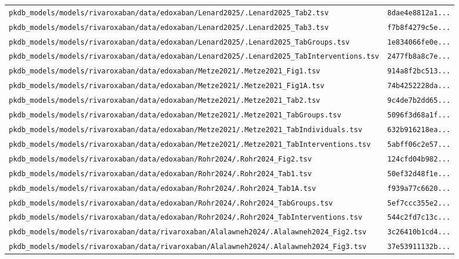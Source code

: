 \begin{longtable}{ll}
\texttt{pkdb\_models/models/rivaroxaban/data/edoxaban/Lenard2025/.Lenard2025\_Tab2.tsv} & \texttt{8dae4e8812a1...} \\
\texttt{pkdb\_models/models/rivaroxaban/data/edoxaban/Lenard2025/.Lenard2025\_Tab3.tsv} & \texttt{f7b8f4279c5e...} \\
\texttt{pkdb\_models/models/rivaroxaban/data/edoxaban/Lenard2025/.Lenard2025\_TabGroups.tsv} & \texttt{1e834066fe0e...} \\
\texttt{pkdb\_models/models/rivaroxaban/data/edoxaban/Lenard2025/.Lenard2025\_TabInterventions.tsv} & \texttt{2477fb8a8c7e...} \\
\texttt{pkdb\_models/models/rivaroxaban/data/edoxaban/Metze2021/.Metze2021\_Fig1.tsv} & \texttt{914a8f2bc513...} \\
\texttt{pkdb\_models/models/rivaroxaban/data/edoxaban/Metze2021/.Metze2021\_Fig1A.tsv} & \texttt{74b4252228da...} \\
\texttt{pkdb\_models/models/rivaroxaban/data/edoxaban/Metze2021/.Metze2021\_Tab2.tsv} & \texttt{9c4de7b2dd65...} \\
\texttt{pkdb\_models/models/rivaroxaban/data/edoxaban/Metze2021/.Metze2021\_TabGroups.tsv} & \texttt{5096f3d68a1f...} \\
\texttt{pkdb\_models/models/rivaroxaban/data/edoxaban/Metze2021/.Metze2021\_TabIndividuals.tsv} & \texttt{632b916218ea...} \\
\texttt{pkdb\_models/models/rivaroxaban/data/edoxaban/Metze2021/.Metze2021\_TabInterventions.tsv} & \texttt{5abff06c2e57...} \\
\texttt{pkdb\_models/models/rivaroxaban/data/edoxaban/Rohr2024/.Rohr2024\_Fig2.tsv} & \texttt{124cfd04b982...} \\
\texttt{pkdb\_models/models/rivaroxaban/data/edoxaban/Rohr2024/.Rohr2024\_Tab1.tsv} & \texttt{50ef32d48f1e...} \\
\texttt{pkdb\_models/models/rivaroxaban/data/edoxaban/Rohr2024/.Rohr2024\_Tab1A.tsv} & \texttt{f939a77c6620...} \\
\texttt{pkdb\_models/models/rivaroxaban/data/edoxaban/Rohr2024/.Rohr2024\_TabGroups.tsv} & \texttt{5ef7ccc355e2...} \\
\texttt{pkdb\_models/models/rivaroxaban/data/edoxaban/Rohr2024/.Rohr2024\_TabInterventions.tsv} & \texttt{544c2fd7c13c...} \\
\texttt{pkdb\_models/models/rivaroxaban/data/rivaroxaban/Alalawneh2024/.Alalawneh2024\_Fig2.tsv} & \texttt{3c26410b1cd4...} \\
\texttt{pkdb\_models/models/rivaroxaban/data/rivaroxaban/Alalawneh2024/.Alalawneh2024\_Fig3.tsv} & \texttt{37e53911132b...} \\

\end{longtable}
